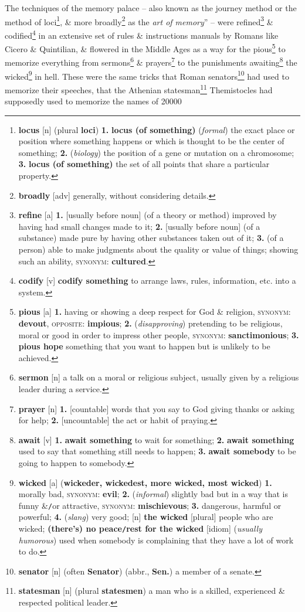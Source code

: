 \documentclass[oneside]{book}
\numberwithin{equation}{section}
\begin{document}
The techniques of the memory palace -- also known as the journey method or the method of loci\footnote{\textbf{locus} [n] (plural \textbf{loci}) \textbf{1.} \textbf{locus (of something)} (\textit{formal}) the exact place or position where something happens or which is thought to be the center of something; \textbf{2.} (\textit{biology}) the position of a gene or mutation on a chromosome; \textbf{3.} \textbf{locus (of something)} the set of all points that share a particular property.}, \& more broadly\footnote{\textbf{broadly} [adv] generally, without considering details.} as the \textit{art of memory}'' -- were refined\footnote{\textbf{refine} [a] \textbf{1.} [usually before noun] (of a theory or method) improved by having had small changes made to it; \textbf{2.} [usually before noun] (of a substance) made pure by having other substances taken out of it; \textbf{3.} (of a person) able to make judgments about the quality or value of things; showing such an ability, \textsc{synonym}: \textbf{cultured}.} \& codified\footnote{\textbf{codify} [v] \textbf{codify something} to arrange laws, rules, information, etc. into a system.} in an extensive set of rules \& instructions manuals by Romans like Cicero \& Quintilian, \& flowered in the Middle Ages as a way for the pious\footnote{\textbf{pious} [a] \textbf{1.} having or showing a deep respect for God \& religion, \textsc{synonym}: \textbf{devout}, \textsc{opposite}: \textbf{impious}; \textbf{2.} (\textit{disapproving}) pretending to be religious, moral or good in order to impress other people, \textsc{synonym}: \textbf{sanctimonious}; \textbf{3.} \textbf{pious hope} something that you want to happen but is unlikely to be achieved.} to memorize everything from sermons\footnote{\textbf{sermon} [n] a talk on a moral or religious subject, usually given by a religious leader during a service.} \& prayers\footnote{\textbf{prayer} [n] \textbf{1.} [countable] words that you say to God giving thanks or asking for help; \textbf{2.} [uncountable] the act or habit of praying.} to the punishments awaiting\footnote{\textbf{await} [v] \textbf{1.} \textbf{await something} to wait for something; \textbf{2.} \textbf{await something} used to say that something still needs to happen; \textbf{3.} \textbf{await somebody} to be going to happen to somebody.} the wicked\footnote{\textbf{wicked} [a] (\textbf{wickeder, wickedest, more wicked, most wicked}) \textbf{1.} morally bad, \textsc{synonym}: \textbf{evil}; \textbf{2.} (\textit{informal}) slightly bad but in a way that is funny \&\texttt{/}or attractive, \textsc{synonym}: \textbf{mischievous}; \textbf{3.} dangerous, harmful or powerful; \textbf{4.} (\textit{slang}) very good; [n] \textbf{the wicked} [plural] people who are wicked; \textbf{(there's) no peace\texttt{/}rest for the wicked} [idiom] (\textit{usually humorous}) used when somebody is complaining that they have a lot of work to do.} in hell. These were the same tricks that Roman senators\footnote{\textbf{senator} [n] (often \textbf{Senator}) (abbr., \textbf{Sen.}) a member of a senate.} had used to memorize their speeches, that the Athenian statesman\footnote{\textbf{statesman} [n] (plural \textbf{statesmen}) a man who is a skilled, experienced \& respected political leader.} Themistocles had supposedly used to memorize the names of 20000 
\end{document}
